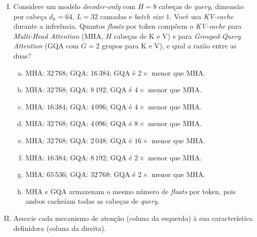 \documentclass{dlproblemset}
\begin{document}
\begin{enumerate}[I)]
\item Considere um modelo \textit{decoder-only} com $H = 8$ cabeças de \textit{query}, dimensão por cabeça $d_k = 64$, $L = 32$ camadas e \textit{batch size} $1$. Você usa \textit{KV-cache} durante a inferência. Quantos \textit{floats} por token compõem o \textit{KV-cache} para \textit{Multi-Head Attention} (MHA, $H$ cabeças de K e V) e para \textit{Grouped-Query Attention} (GQA com $G = 2$ grupos para K e V), e qual a razão entre as duas?
\begin{enumerate}[a)]
    \item MHA: $32\,768$; GQA: $16\,384$; GQA é $2\times$ menor que MHA.
    \item MHA: $32\,768$; GQA: $8\,192$; GQA é $4\times$ menor que MHA.
    \item MHA: $16\,384$; GQA: $4\,096$; GQA é $4\times$ menor que MHA.
    \item MHA: $32\,768$; GQA: $4\,096$; GQA é $8\times$ menor que MHA.
    \item MHA: $32\,768$; GQA: $2\,048$; GQA é $16\times$ menor que MHA.
    \item MHA: $16\,384$; GQA: $8\,192$; GQA é $2\times$ menor que MHA.
    \item MHA: $65\,536$; GQA: $32\,768$; GQA é $2\times$ menor que MHA.
    \item MHA e GQA armazenam o mesmo número de \textit{floats} por token, pois ambos cacheiam todas as cabeças de \textit{query}.
\end{enumerate}

\item Associe cada mecanismo de atenção (coluna da esquerda) à sua característica definidora (coluna da direita).


\end{enumerate}
\end{document}
